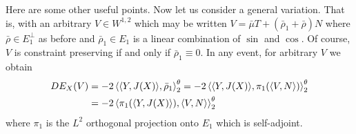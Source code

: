 \documentclass[12pt]{article}
\begin{document}
\begin{rem}
{\color{red} Here are some other useful points.}
Now let us consider a general variation. That is, with an arbitrary \(V \in W^{1,2}\) which may be written \(V = \bar{\mu}T + (\bar{\rho}_1 + \bar{\rho}) N\) where \(\bar{\rho} \in E_1^{\perp}\) as before and \(\bar{\rho}_1 \in E_1\) is a linear combination of \(\sin\) and \(\cos\). Of course, \(V\) is constraint preserving if and only if \(\bar{\rho}_1 \equiv 0\). In any event, for arbitrary \(V\) we obtain
\[
\begin{split}
DE_X(V) &= -2 \left\langle{\ensuremath{\left\langle{Y},{J(X)}\right\rangle}},{\bar{\rho}_1}\right\rangle_2^{\theta} = -2\left\langle{\ensuremath{\left\langle{Y},{J(X)}\right\rangle}},{\pi_1(\left\langle{V},{N}\right\rangle)}\right\rangle_2^{\theta} \\
&= -2\left\langle{\pi_1(\ensuremath{\left\langle{Y},{J(X)}\right\rangle})},{\left\langle{V},{N}\right\rangle}\right\rangle_2^{\theta}
\end{split}
\]
where \(\pi_1\) is the \(L^2\) orthogonal projection onto \(E_1\) which is self-adjoint.
\end{rem}
\end{document}
